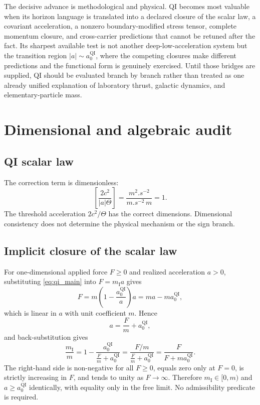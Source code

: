 \documentclass[11pt]{article}
\newcommand{\QI}{\mathrm{QI}}
\begin{document}
The decisive advance is methodological and physical. QI becomes most valuable when its horizon language is translated into a declared closure of the scalar law, a covariant acceleration, a nonzero boundary-modified stress tensor, complete momentum closure, and cross-carrier predictions that cannot be retuned after the fact. Its sharpest available test is not another deep-low-acceleration system but the transition region \(|a|\sim a_{0}^{\QI}\), where the competing closures make different predictions and the functional form is genuinely exercised. Until those bridges are supplied, QI should be evaluated branch by branch rather than treated as one already unified explanation of laboratory thrust, galactic dynamics, and elementary-particle mass.

\appendix

\section{Dimensional and algebraic audit}
\label{app:algebra}

\subsection{QI scalar law}

The correction term is dimensionless:
\begin{equation}
    \left[\frac{2c^{2}}{|a|\Theta}\right]
    =\frac{\si{m^2.s^{-2}}}{\si{m.s^{-2}}\,\si{m}}=1.
\end{equation}
The threshold acceleration \(2c^{2}/\Theta\) has the correct dimensions. Dimensional consistency does not determine the physical mechanism or the sign branch.

\subsection{Implicit closure of the scalar law}
\label{app:implicit_closure}

For one-dimensional applied force \(F\ge0\) and realized acceleration \(a>0\), substituting \cref{eq:qi_main} into \(F=m_{\mathrm I}a\) gives
\begin{equation}
    F=m\left(1-\frac{a_{0}^{\QI}}{a}\right)a
     =ma-ma_{0}^{\QI},
\end{equation}
which is linear in \(a\) with unit coefficient \(m\). Hence
\begin{equation}
    a=\frac{F}{m}+a_{0}^{\QI},
\end{equation}
and back-substitution gives
\begin{equation}
    \frac{m_{\mathrm I}}{m}
    =1-\frac{a_{0}^{\QI}}{\frac{F}{m}+a_{0}^{\QI}}
    =\frac{F/m}{\frac{F}{m}+a_{0}^{\QI}}
    =\frac{F}{F+ma_{0}^{\QI}}.
\end{equation}
The right-hand side is non-negative for all \(F\ge0\), equals zero only at \(F=0\), is strictly increasing in \(F\), and tends to unity as \(F\to\infty\). Therefore \(m_{\mathrm I}\in[0,m)\) and \(a\ge a_{0}^{\QI}\) identically, with equality only in the free limit. No admissibility predicate is required.
\end{document}
